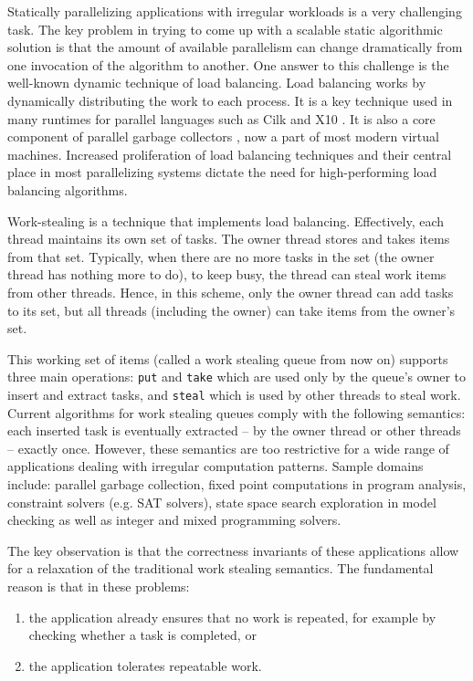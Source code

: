 Statically parallelizing applications with irregular workloads is a
very challenging task. The key problem in trying to come up with a
scalable static algorithmic solution is that the amount of available
parallelism can change dramatically from one invocation of the
algorithm to another. One answer to this challenge is the well-known
dynamic technique of load balancing. Load balancing works by
dynamically distributing the work to each process. It is a key
technique used in many runtimes for parallel languages such as Cilk
\cite{Blumofe1995, Frigo1998} and X10 \cite{Charles2005,
  Saraswat2010}. It is also a core component of parallel garbage
collectors \cite{Flood2001}, now a part of most modern virtual
machines. Increased proliferation of load balancing techniques and
their central place in most parallelizing systems dictate the need for
high-performing load balancing algorithms.

Work-stealing is a technique that implements load balancing.
Effectively, each thread maintains its own set of tasks. The owner
thread stores and takes items from that set. Typically, when there are
no more tasks in the set (the owner thread has nothing more to do), to
keep busy, the thread can steal work items from other threads. Hence,
in this scheme, only the owner thread can add tasks to its set, but
all threads (including the owner) can take items from the owner's set.

This working set of items (called a work stealing queue from now on)
supports three main operations: \lstinline!put! and \lstinline!take!
which are used only by the queue's owner to insert and extract tasks,
and \lstinline!steal! which is used by other threads to steal work.
Current algorithms for work stealing queues comply with the following
semantics: each inserted task is eventually extracted -- by the owner
thread or other threads -- exactly once. However, these semantics are
too restrictive for a wide range of applications dealing with
irregular computation patterns. Sample domains include: parallel
garbage collection, fixed point computations in program analysis,
constraint solvers (e.g. SAT solvers), state space search exploration
in model checking as well as integer and mixed programming solvers.

The key observation is that the correctness invariants of these
applications allow for a relaxation of the traditional work stealing
semantics. The fundamental reason is that in these problems:

\begin{enumerate}
\item the application already ensures that no work is repeated, for
  example by checking whether a task is completed, or
\item the application tolerates repeatable work.
\end{enumerate}

